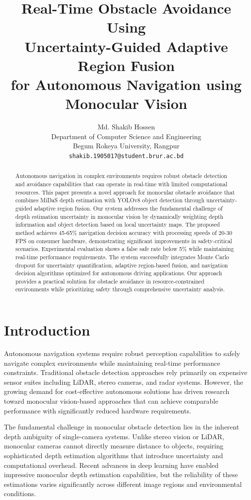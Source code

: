 \documentclass[10pt]{article}
\title{\LARGE \bf
Real-Time Obstacle Avoidance Using \\
Uncertainty-Guided Adaptive Region Fusion \\
for Autonomous Navigation using Monocular Vision
}
\author{
\normalsize Md. Shakib Hossen\\
\normalsize Department of Computer Science and Engineering\\
\normalsize Begum Rokeya University, Rangpur\\
\normalsize \texttt{shakib.1905017@student.brur.ac.bd}
}
\begin{document}
\maketitle

\begin{abstract}
Autonomous navigation in complex environments requires robust obstacle detection and avoidance capabilities that can operate in real-time with limited computational resources. This paper presents a novel approach for monocular obstacle avoidance that combines MiDaS depth estimation with YOLOv8 object detection through uncertainty-guided adaptive region fusion. Our system addresses the fundamental challenge of depth estimation uncertainty in monocular vision by dynamically weighting depth information and object detection based on local uncertainty maps. The proposed method achieves 45-65\% navigation decision accuracy with processing speeds of 20-30 FPS on consumer hardware, demonstrating significant improvements in safety-critical scenarios. Experimental evaluation shows a false safe rate below 5\% while maintaining real-time performance requirements. The system successfully integrates Monte Carlo dropout for uncertainty quantification, adaptive region-based fusion, and navigation decision algorithms optimized for autonomous driving applications. Our approach provides a practical solution for obstacle avoidance in resource-constrained environments while prioritizing safety through comprehensive uncertainty analysis.
\end{abstract}

\section{Introduction}

Autonomous navigation systems require robust perception capabilities to safely navigate complex environments while maintaining real-time performance constraints. Traditional obstacle detection approaches rely primarily on expensive sensor suites including LiDAR, stereo cameras, and radar systems. However, the growing demand for cost-effective autonomous solutions has driven research toward monocular vision-based approaches that can achieve comparable performance with significantly reduced hardware requirements.

The fundamental challenge in monocular obstacle detection lies in the inherent depth ambiguity of single-camera systems. Unlike stereo vision or LiDAR, monocular cameras cannot directly measure distance to objects, requiring sophisticated depth estimation algorithms that introduce uncertainty and computational overhead. Recent advances in deep learning have enabled impressive monocular depth estimation capabilities, but the reliability of these estimations varies significantly across different image regions and environmental conditions.
\end{document}
